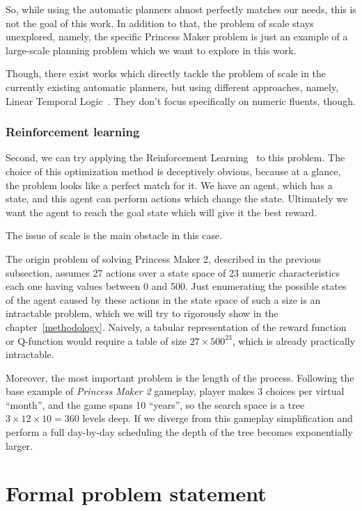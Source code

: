 \documentclass[12pt, a4paper]{report}
\begin{document}
	So, while using the automatic planners almost perfectly matches our needs, this is not the goal of this work.
	In addition to that, the problem of scale stays unexplored, namely, the specific Princess Maker problem is just an example of a large-scale planning problem which we want to explore in this work.
	
	Though, there exist works which directly tackle the problem of scale in the currently existing automatic planners, but using different approaches, namely, Linear Temporal Logic~\cite{LU2025121666}.
	They don't focus specifically on numeric fluents, though.

  \subsection{Reinforcement learning}
	Second, we can try applying the Reinforcement Learning~\cite{sutton2018reinforcement} to this problem.
	The choice of this optimization method is deceptively obvious, because at a glance, the problem looks like a perfect match for it.
	We have an agent, which has a state, and this agent can perform actions which change the state.
	Ultimately we want the agent to reach the goal state which will give it the best reward.
	
	The issue of scale is the main obstacle in this case.

	The origin problem of solving Princess Maker 2, described in the previous subsection,  assumes 27 actions over a state space of 23 numeric characteristics each one having values between 0 and 500.
	Just enumerating the possible states of the agent caused by these actions in the state space of such a size is an intractable problem, which we will try to rigorously show in the chapter~\ref{methodology}.
	Naively, a tabular representation of the reward function or Q-function would require a table of size $27 \times 500^{23}$, which is already practically intractable.
	
	Moreover, the most important problem is the length of the process.
	Following the base example of \textit{Princess Maker 2} gameplay, player makes 3 choices per virtual ``month'', and the game spans 10 ``years'', so the search space is a tree $3 \times 12 \times 10 = 360$ levels deep.
	If we diverge from this gameplay simplification and perform a full day-by-day scheduling the depth of the tree becomes exponentially larger.
	
	\chapter{Formal problem statement}\label{problem-statement}
\end{document}
